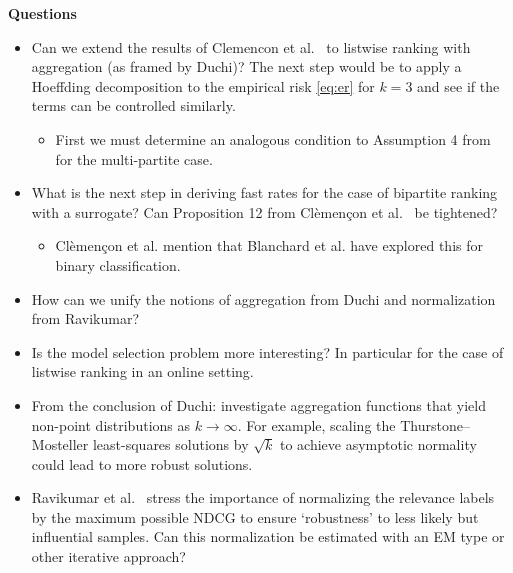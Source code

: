 \documentclass[a4paper,10pt]{article}
\begin{document}
\textbf{Questions}

\begin{itemize}
  \item Can we extend the results of Clemencon et al.~\cite{clemencon-2008-ranking-rates} to listwise ranking with aggregation (as framed by Duchi)? The next step would be to apply a Hoeffding decomposition to the empirical risk \ref{eq:er} for \(k=3\) and see if the terms can be controlled similarly.
    \begin{itemize}
      \item First we must determine an analogous condition to Assumption 4 from \cite{clemencon-2008-ranking-rates} for the multi-partite case.
    \end{itemize}
  \item What is the next step in deriving fast rates for the case of bipartite ranking with a surrogate? Can Proposition 12 from Cl\`{e}men\c{c}on et al.~\cite{clemencon-2008-ranking-rates} be tightened?
    \begin{itemize}
      \item Cl\`{e}men\c{c}on et al. mention that Blanchard et al. \cite{blanchard-2003-rates} have explored this for binary classification.
    \end{itemize}
  \item How can we unify the notions of aggregation from Duchi and normalization from Ravikumar?
  \item Is the model selection problem more interesting? In particular for the case of listwise ranking in an online setting.
  \item From the conclusion of Duchi: investigate aggregation functions that yield non-point distributions as \(k\rightarrow \infty\). For example, scaling the Thurstone–Mosteller least-squares solutions by \(\sqrt k\) to achieve asymptotic normality could lead to more robust solutions.
  \item Ravikumar et al.~\cite{ravikumar-2011-ranking} stress the importance of normalizing the relevance labels by the maximum possible NDCG to ensure `robustness' to less likely but influential samples. Can this normalization be estimated with an EM type or other iterative approach?
\end{itemize}

{}
\end{document}
